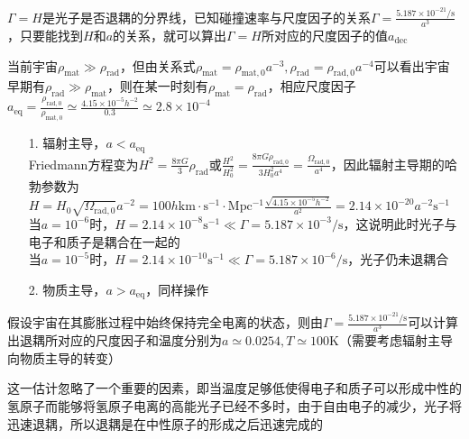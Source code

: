 \par 
$\Gamma = H$是光子是否退耦的分界线，已知碰撞速率与尺度因子的关系$\Gamma = \frac { 5.187 \times 10 ^ { - 21 } / \mathrm{s} } { a ^ { 3 } }$，只要能找到$H$和$a$的关系，就可以算出$\Gamma = H$所对应的尺度因子的值$a_{\text{dec}}$
\par 
当前宇宙$\rho_{\text{mat}} \gg \rho_{\text{rad}}$，但由关系式$\rho_{\text{mat}} = \rho_{\text{mat}, 0} a^{-3}, \rho_{\text{rad}} = \rho_{\text{rad}, 0} a^{-4}$可以看出宇宙早期有$\rho_{\text{rad}} \gg \rho_{\text{mat}}$，则在某一时刻有$\rho_{\text{mat}} = \rho_{\text{rad}}$，相应尺度因子$a_{\text{eq}} = 	\frac{\rho_{\text{rad}, 0}}{\rho_{\text{mat}, 0}} \simeq \frac{4.15 \times 10^{-5} h^{-2}}{0.3} \simeq 2.8 \times 10^{-4}$

\begin{itemize}
	\item[1. ] 辐射主导，$a < a_{\text{eq}}$ \\
	Friedmann方程变为$H^2 = \frac{8 \pi G}{3} \rho_{\text{rad}}$或$\frac { H ^ { 2 } } { H _ { 0 } ^ { 2 } } = \frac { 8 \pi G \rho_{\text{rad}, 0} } { 3 H _ { 0 } ^ { 2 } a^4}  = \frac { \Omega _ { \text{rad}, 0 } } { a ^ { 4 } }$，因此辐射主导期的哈勃参数为$H = H_0 \sqrt{\Omega_{\text{rad}, 0}} a^{-2} = 100 h \mathrm{km \cdot s^{-1} \cdot Mpc^{-1}} \frac{\sqrt{4.15 \times 10^{-5} h^{-2}}}{a^2} = 2.14 \times 10^{-20} a^{-2} \mathrm{s^{-1}}$ \\
	当$a = 10^{-6}$时，$H = 2.14 \times 10 ^ { - 8 } \mathrm{s ^ { - 1 }} \ll \Gamma = 5.187 \times 10 ^ { - 3 } / \mathrm{s}$，这说明此时光子与电子和质子是耦合在一起的 \\
	当$a = 10^{-5}$时，$H = 2.14 \times 10 ^ { - 10 } \mathrm{s ^ { - 1 }} \ll \Gamma = 5.187 \times 10 ^ { - 6 } / \mathrm{s}$，光子仍未退耦合
	
	\item[2. ] 物质主导，$a > a_{\text{eq}}$，同样操作
\end{itemize}

\par 
假设宇宙在其膨胀过程中始终保持完全电离的状态，则由$\Gamma = \frac { 5.187 \times 10 ^ { - 21 } / \mathrm{s} } { a ^ { 3 } }$可以计算出退耦所对应的尺度因子和温度分别为$a \simeq 0.0254, T \simeq 100 \mathrm{K}$（需要考虑辐射主导向物质主导的转变）

\par 
这一估计忽略了一个重要的因素，即当温度足够低使得电子和质子可以形成中性的氢原子而能够将氢原子电离的高能光子已经不多时，由于自由电子的减少，光子将迅速退耦，所以退耦是在中性原子的形成之后迅速完成的

